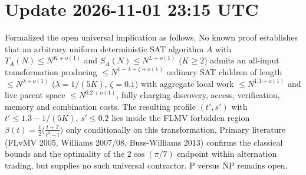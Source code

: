 
\section*{Update 2026-11-01 23:15 UTC}
Formalized the open universal implication as follows. No known proof establishes that an arbitrary uniform deterministic SAT algorithm $A$ with $T_A(N)\le N^{K+o(1)}$ and $S_A(N)\le N^{L+o(1)}$ ($K\ge 2$) admits an all-input transformation producing $\le N^{1-\lambda+\zeta+o(1)}$ ordinary SAT children of length $\le N^{\lambda+o(1)}$ ($\lambda=1/(5K)$, $\zeta=0.1$) with aggregate local work $\le N^{1.1+o(1)}$ and live parent space $\le N^{0.2+o(1)}$, fully charging discovery, access, verification, memory and combination costs. The resulting profile $(t',s')$ with $t'\le 1.3-1/(5K)$, $s'\le 0.2$ lies inside the FLMV forbidden region $\beta(t)=\frac12\bigl(\frac{t+2}{t^2-t}\bigr)$ only conditionally on this transformation. Primary literature (FLvMV 2005, Williams 2007/08, Buss-Williams 2013) confirms the classical bounds and the optimality of the $2\cos(\pi/7)$ endpoint within alternation trading, but supplies no such universal contractor. P versus NP remains open.
